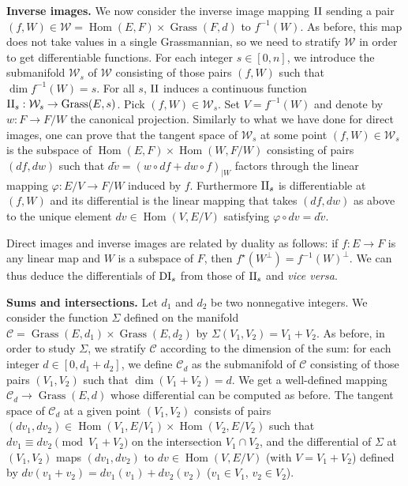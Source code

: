 \documentclass{sig-alternate-2013}
\DeclareMathOperator{\Hom}{Hom}
\DeclareMathOperator{\Grass}{Grass}
\newcommand{\DI}{\text{\rm DI}}
\newcommand{\II}{\text{\rm II}}
\begin{document}
\smallskip

\noindent
{\bf Inverse images.}
We now consider the inverse image mapping $\II$ sending a 
pair $(f,W) \in \mathcal W = \Hom(E,F) \times \Grass(F,d)$ to 
$f^{-1}(W)$. As before, this map does not take values in a single 
Grassmannian, so we need to stratify $\mathcal W$ in order to get 
differentiable functions. For each integer $s \in [0,n]$, we introduce 
the submanifold $\mathcal W_s$ of $\mathcal W$ consisting of those 
pairs $(f,W)$ such that $\dim f^{-1}(W) = s$. For all $s$, $\II$ 
induces a continuous function
$\II_s : \mathcal W_s \to \Grass(E,s)$.
Pick $(f,W) \in \mathcal W_s$. Set $V = f^{-1}(W)$ and denote by $w : F 
\to F/W$ the canonical projection.
Similarly to what we have done for direct images, one can prove that
the tangent space of $\mathcal W_s$ at some point $(f,W) \in \mathcal
W_s$ is the subspace of $\Hom(E,F) \times \Hom(W,F/W)$ consisting of 
pairs $(df,dw)$ such that
$d \tilde v = (w \circ df + dw \circ f)_{|W}$
factors through the linear mapping $\varphi : E/V \to F/W$ induced by 
$f$. Furthermore $\II_s$ is differentiable at $(f,W)$ and its 
differential is the linear mapping that takes $(df,dw)$ as above to the 
unique element $dv \in \Hom(V,E/V)$ satisfying $\varphi \circ dv =
d\tilde v$.

Direct images and inverse images are related by duality
as follows: if $f : E \to F$ is any linear map and $W$ is a subspace
of $F$, then $f^\star(W^\perp) = f^{-1}(W)^\perp$. We 
can thus deduce the differentials of $\DI_s$ from those of $\II_s$ and 
\emph{vice versa}.


\smallskip

\noindent
{\bf Sums and intersections.}
Let $d_1$ and $d_2$ be two nonnegative integers. We consider the 
function $\Sigma$ defined on the manifold $\mathcal C = \Grass(E,d_1) 
\times \Grass(E,d_2)$ by $\Sigma(V_1, V_2) = V_1 + V_2$. As before, in 
order to study $\Sigma$, we stratify $\mathcal C$ according to the 
dimension of the sum: for each integer $d \in [0, d_1+d_2]$, we define 
$\mathcal C_d$ as the submanifold of $\mathcal C$ consisting of those 
pairs $(V_1, V_2)$ such that $\dim(V_1 + V_2) = d$. We get a 
well-defined mapping $\mathcal C_d \to \Grass(E,d)$ whose differential
can be computed as before. The
tangent space of $\mathcal C_d$ at a given point $(V_1, V_2)$ consists 
of pairs $(dv_1, dv_2) \in \Hom(V_1, E/V_1)
\times \Hom(V_2, E/V_2)$ such that $dv_1 \equiv dv_2 \pmod{V_1 + V_2}$ 
on the intersection $V_1 \cap V_2$, and the differential of $\Sigma$
at $(V_1, V_2)$ maps $(dv_1, dv_2)$ to $dv \in \Hom(V, E/V)$ (with $V
= V_1 + V_2$) defined by $dv(v_1 + v_2) = dv_1(v_1) + dv_2(v_2)$ ($v_1
\in V_1$, $v_2 \in V_2$).
\end{document}
